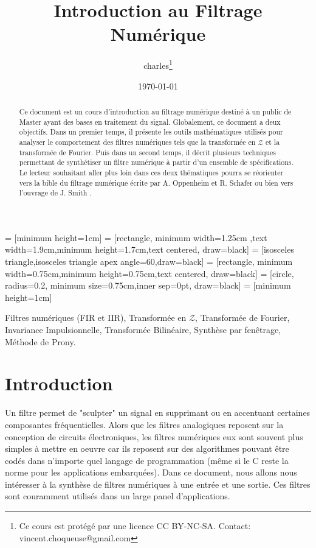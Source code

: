 \documentclass[11pt,a4paper]{IEEEtran}
\author{charles\thanks{Ce cours est protégé par une licence CC BY-NC-SA. Contact: vincent.choqueuse@gmail.com}}
\title{Introduction au Filtrage Numérique}
\date{\today}
\begin{document}
\maketitle

 = [minimum height=1cm]
 = [rectangle, minimum width=1.25cm ,text width=1.9cm,minimum height=1.7cm,text centered, draw=black]
 = [isosceles triangle,isosceles triangle apex angle=60,draw=black]
 = [rectangle, minimum width=0.75cm,minimum height=0.75cm,text centered, draw=black]
 = [circle, radius=0.2, minimum size=0.75cm,inner sep=0pt, draw=black]
 = [minimum height=1cm]


\begin{abstract}
Ce document est un cours d'introduction au filtrage numérique destiné à un public de Master ayant des bases en traitement du signal. Globalement, ce document a deux objectifs. Dans un premier temps, il présente les outils mathématiques utilisés pour analyser le comportement des filtres numériques tels que la transformée en $\mathcal{Z}$ et la transformée de Fourier. Puis dans un second temps, il décrit plusieurs techniques permettant de synthétiser un filtre numérique à partir d'un ensemble de spécifications. Le lecteur souhaitant aller plus loin dans ces deux thématiques pourra se réorienter vers la bible du filtrage numérique écrite par A. Oppenheim et R. Schafer \cite{opp} ou bien vers l'ouvrage de J. Smith \cite{smi}.
\end{abstract}

\begin{keywords}
Filtres numériques (FIR et IIR), Transformée en $\mathcal{Z}$, Transformée de Fourier, Invariance Impulsionnelle, Transformée Bilinéaire, Synthèse par fenêtrage, Méthode de Prony.
\end{keywords}

\section{Introduction}



Un filtre permet de "sculpter" un signal en supprimant ou en accentuant certaines composantes fréquentielles. Alors que les filtres analogiques reposent sur la conception de circuits électroniques, les filtres numériques eux sont souvent plus simples à mettre en oeuvre car ils reposent sur des algorithmes pouvant être codés dans n'importe quel langage de programmation (même si le C reste la norme pour les applications embarquées). Dans ce document, nous allons nous intéresser à la synthèse de filtres numériques à une entrée et une sortie. Ces filtres sont couramment utilisés dans un large panel d'applications. 
\end{document}

